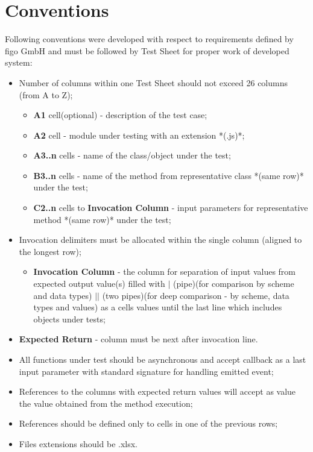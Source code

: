 \chapter{Conventions}
\label{sec:convnetions}
Following conventions were developed with respect to requirements defined by figo GmbH and must be followed by Test Sheet for proper work of developed system:
\begin{itemize}
	\item Number of columns within one Test Sheet should not exceed 26 columns (from A to Z);
	\begin{itemize}
		\item \textbf{A1} cell(optional) - description of the test case;
		\item \textbf{A2} cell - module under testing with an extension *(.js)*;
		\item \textbf{A3..n} cells - name of the class/object under the test;
		\item \textbf{B3..n} cells - name of the method from representative class *(same row)* under the test;
		\item \textbf{C2..n} cells to \textbf{Invocation Column}   - input parameters for representative method *(same row)* under the test;
	\end{itemize}
	\item Invocation delimiters must be allocated within the single column (aligned to the longest row);
	\begin{itemize}
		\item \textbf{Invocation Column} - the column for separation of input values from expected output value(s) filled with $|$ (pipe)(for comparison by scheme and data types) $||$ (two pipes)(for deep comparison - by scheme, data types and values) as a cells values until the last line which includes objects under tests;
	\end{itemize}
	\item \textbf{Expected Return} - column must be next after invocation line.
	\item All functions under test should be asynchronous and accept callback as a last input parameter with standard signature for handling emitted event;
	\item References to the columns with expected return values will accept as value the value obtained from the method execution;
	\item References should be defined only to cells in one of the previous rows;
	\item Files extensions should be .xlsx.
\end{itemize}

